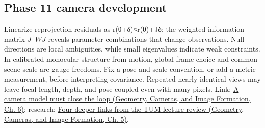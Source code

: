 \subsection{Phase 11 camera development}\label{appendix-3ee9861904d5-phase-11-camera-development}

Linearize reprojection residuals as r(θ+δ)≈r(θ)+Jδ; the weighted information matrix \(J^{\mathsf T}WJ\) reveals parameter combinations that change observations. Null directions are local ambiguities, while small eigenvalues indicate weak constraints. In calibrated monocular structure from motion, global frame choice and common scene scale are gauge freedoms. Fix a pose and scale convention, or add a metric measurement, before interpreting covariance. Repeated nearly identical views may leave focal length, depth, and pose coupled even with many pixels. Link: \href{../03-Geometry-Cameras-and-Image-Formation/main.pdf\#nameddest=02-foundations-ii-ch037-a-camera-model-must-close-the-loop}{A camera model must close the loop (Geometry, Cameras, and Image Formation, Ch. 6)}; research: \href{../03-Geometry-Cameras-and-Image-Formation/main.pdf\#nameddest=02-foundations-ii-ch036-four-deeper-links-from-the-tum-lecture-review}{Four deeper links from the TUM lecture review (Geometry, Cameras, and Image Formation, Ch. 5)}.

